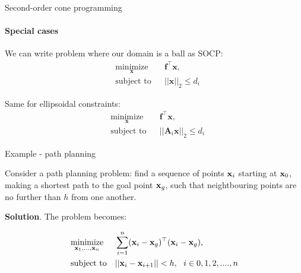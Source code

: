 \documentclass{beamer}
\begin{document}
\begin{frame}{Second-order cone programming}
\framesubtitle{Special cases}
\begin{flushleft}

We can write problem where our domain is a ball as SOCP:
%
\begin{equation}
\begin{aligned}
& \underset{\mathbf{x}}{\text{minimize}}
& & \mathbf{f}^\top\mathbf{x}, \\
& \text{subject to}
& & ||\mathbf{x}||_2 \leq d_i
\end{aligned}
\end{equation}

\bigskip

Same for ellipsoidal constraints:
%
\begin{equation}
\begin{aligned}
& \underset{\mathbf{x}}{\text{minimize}}
& & \mathbf{f}^\top\mathbf{x}, \\
& \text{subject to}
& & ||\mathbf{A}_i\mathbf{x}||_2 \leq d_i
\end{aligned}
\end{equation}
 
\end{flushleft}
\end{frame}




\begin{frame}{Example - path planning}
	\begin{flushleft}
		
		Consider a path planning problem: find a sequence of points $\mathbf{x}_i$ starting at $\mathbf{x}_0$, making a shortest path to the goal point $\mathbf{x}_g$, such that neightbouring points are no further than $h$ from one another.
		
		\bigskip
		
		\textbf{Solution}. 
		The problem becomes:
		
		
		\begin{equation}
			\begin{aligned}
				& \underset{\mathbf{x}_1, ..., \mathbf{x}_n}{\text{minimize}}
				& & \sum_{i = 1}^{n} (\mathbf{x}_i - \mathbf{x}_g)^\top (\mathbf{x}_i - \mathbf{x}_g), \\
				& \text{subject to}
				& &||\mathbf{x}_i - \mathbf{x}_{i+1} || < h, \ \ i \in {0, 1, 2, ...., n}
			\end{aligned}
		\end{equation}
		
	\end{flushleft}
\end{frame}
\end{document}
